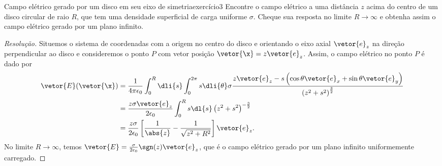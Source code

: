 \begin{exercício}{Campo elétrico gerado por um disco em seu eixo de simetria}{exercício3}
    Encontre o campo elétrico a uma distância \(z\) acima do centro de um disco circular de raio \(R\), que tem uma densidade superficial de carga uniforme \(\sigma\). Cheque sua resposta no limite \(R \to \infty\) e obtenha assim o campo elétrico gerado por um plano infinito.
\end{exercício}
\begin{proof}[Resolução]
    Situemos o sistema de coordenadas com a origem no centro do disco e orientando o eixo axial \(\vetor{e}_z\) na direção perpendicular ao disco e consideremos o ponto \(P\) com vetor posição \(\vetor{\x} = z\vetor{e}_z\). Assim, o campo elétrico no ponto \(P\) é dado por
    \begin{align*}
        \vetor{E}(\vetor{\x}) &= \frac1{4\pi \epsilon_0} \int_0^R\dli{s} \int_0^{2\pi} s\dli{\theta} \sigma\frac{z\vetor{e}_z - s\left(\cos\theta \vetor{e}_x + \sin\theta \vetor{e}_y\right)}{\left(z^2 + s^2\right)^{\frac32}}\\
                              &= \frac{z \sigma\vetor{e}_z}{2\epsilon_0} \int_0^R s\dl{s} \left(z^2 + s^2\right)^{-\frac32}\\
                              &= \frac{z \sigma}{2 \epsilon_0}\left[\frac1{\abs{z}} - \frac1{\sqrt{z^2 + R^2}}\right]\vetor{e}_z.
    \end{align*}
    No limite \(R \to \infty\), temos \(\vetor{E} = \frac{\sigma}{2 \epsilon_0} \sgn(z)\vetor{e}_z\), que é o campo elétrico gerado por um plano infinito uniformemente carregado.
\end{proof}
